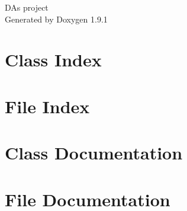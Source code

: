 \let\mypdfximage\pdfximage\def\pdfximage{\immediate\mypdfximage}\documentclass[twoside]{book}
\newcommand{\+}{\discretionary{\mbox{\scriptsize$\hookleftarrow$}}{}{}}
\newcommand{\clearemptydoublepage}{%
  \newpage{\pagestyle{empty}\cleardoublepage}%
}
\begin{document}
\raggedbottom

\hypersetup{pageanchor=false,
             bookmarksnumbered=true,
             pdfencoding=unicode
            }
\begin{titlepage}
\vspace*{7cm}
\begin{center}%
{\Large DA\textquotesingle{}s project }\\
\vspace*{1cm}
{\large Generated by Doxygen 1.9.1}\\
\end{center}
\end{titlepage}
\clearemptydoublepage
{}
\tableofcontents
\clearemptydoublepage
{}
\hypersetup{pageanchor=true}

\chapter{Class Index}

\chapter{File Index}

\chapter{Class Documentation}









\chapter{File Documentation}





\backmatter
\newpage
{}
\clearemptydoublepage
{}
\printindex
\end{document}
